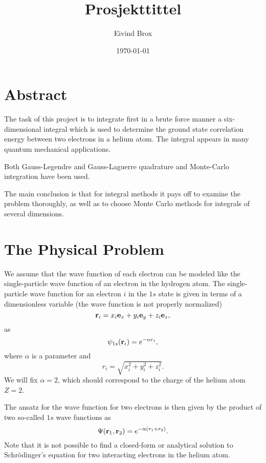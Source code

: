 \documentclass[11pt, a4paper]{article}
\author{Eivind Brox}
\title{Prosjekttittel}
\date{\today}				%
\begin{document}
\maketitle
\thispagestyle{empty}		%
\clearpage					%

\section{Abstract}
The task of this project is to integrate first in a brute force manner a six-dimensional integral which is used to determine the ground state correlation energy between two electrons 
in a helium atom.  The integral appears in many quantum mechanical applications.

Both Gauss-Legendre and Gauss-Laguerre quadrature and Monte-Carlo integration have been used. 

The main conclusion is that for integral methods it pays off to examine the problem thoroughly, as well as to choose Monte Carlo methods for integrals of several dimensions. 


\clearpage
\pagestyle{headings}		%
\tableofcontents			%
\clearpage
{}		%

\clearpage

\section{The Physical Problem}
We assume that the wave function of each electron can be modeled like the single-particle
wave function of an electron in the hydrogen atom. The single-particle wave function  for an electron $i$ in the 
$1s$ state 
is given in terms of a dimensionless variable    (the wave function is not properly normalized)
\[
   {\bf r}_i =  x_i {\bf e}_x + y_i {\bf e}_y +z_i {\bf e}_z ,
\]
as
\[
   \psi_{1s}({\bf r}_i)  =   e^{-\alpha r_i},
\]
where $\alpha$ is a parameter and 
\[
r_i = \sqrt{x_i^2+y_i^2+z_i^2}.
\]
We will fix $\alpha=2$, which should correspond to the charge of the helium atom $Z=2$. 

The ansatz for the wave function for two electrons is then given by the product of two 
so-called 
$1s$ wave functions as 
\[
   \Psi({\bf r}_1,{\bf r}_2)  =   e^{-\alpha (r_1+r_2)}.
\]
Note that it is not possible to find a closed-form or analytical  solution to Schr\"odinger's equation for 
two interacting electrons in the helium atom. 
\end{document}
